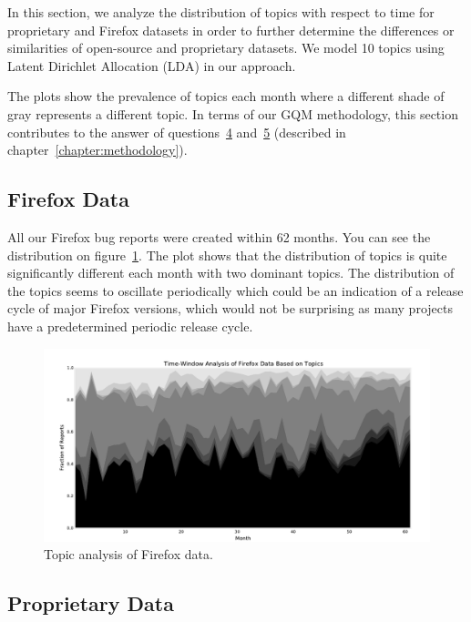 In this section, we analyze the distribution of topics with respect to time for proprietary and Firefox datasets in order to further determine the differences or similarities of open-source and proprietary datasets. We model 10 topics using Latent Dirichlet Allocation (LDA) in our approach.

The plots show the prevalence of topics each month where a different shade of gray represents a different topic. In terms of our GQM methodology, this section contributes to the answer of questions~\hyperlink{question:4}{4} and~\hyperlink{question:5}{5} (described in chapter~\ref{chapter:methodology}).

\subsection{Firefox Data}

All our Firefox bug reports were created within 62 months. You can see the distribution on figure~\ref{fig:distribution.firefox.topic}. The plot shows that the distribution of topics is quite significantly different each month with two dominant topics. The distribution of the topics seems to oscillate periodically which could be an indication of a release cycle of major Firefox versions, which would not be surprising as many projects have a predetermined periodic release cycle.

\begin{figure}[htbp]
    \centering
        \includegraphics[width=\textwidth]{./images/topic_component_distribution/firefox_topic_10.pdf}
    \caption{Topic analysis of Firefox data.}
    \label{fig:distribution.firefox.topic}
\end{figure}

\subsection{Proprietary Data}

